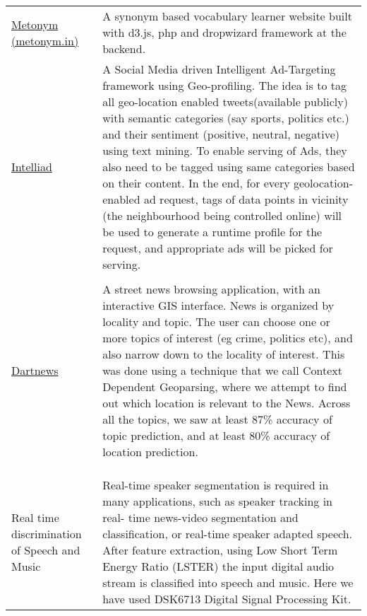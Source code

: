 \documentclass[8pt]{article}
\renewcommand{\section}[2]%
        {\pagebreak[2]\vspace{1.3\baselineskip}%
         \phantomsection\addcontentsline{toc}{section}{#1}%
         \hspace{0.2in}%
         \marginpar{
         \raggedright \scshape #1}#2}
\begin{document}
\section{Projects}
\begin{tabular}[t]{@{}p{\textwidth-\rcollength-180pt}p{\rcollength+150pt}}
        \href{http://metonym.in}{Metonym (metonym.in)} & A synonym based vocabulary learner website built with d3.js, php and dropwizard framework at the backend. \\        
    \href{http://github.com/debjyoti385/intelliad}{Intelliad} &  A Social Media driven Intelligent Ad-Targeting framework using Geo-profiling. The idea is to tag all geo-location enabled tweets(available publicly) with semantic categories (say sports, politics etc.) and their sentiment (positive, neutral, negative) using text mining. To enable serving of Ads, they also need to be tagged using same categories based on their content. In the end, for every geolocation-enabled ad request, tags of data points in vicinity (the neighbourhood being controlled online) will be used to generate a runtime profile for the request, and appropriate ads will be picked for serving.  \\
       \\
       \href{http://github.com/debjyoti385/dartnews}{Dartnews}   & A street news browsing application, with an interactive GIS interface. News is organized by locality and topic. The user can choose one or more topics of interest (eg crime, politics etc), and also narrow down to the locality of interest. This was done using a technique that we call Context Dependent Geoparsing, where we attempt to find out which location is relevant to the News. Across all the topics, we saw at least 87\% accuracy of topic prediction, and at least 80\% accuracy of location prediction.\\
       \\
       \\
       \\
Real time discrimination of Speech and Music & Real-time speaker segmentation is required in many applications, such as speaker tracking in real- time news-video segmentation and classification, or real-time speaker adapted speech. After feature extraction, using Low Short Term Energy Ratio (LSTER) the input digital audio stream is classified into speech and music. Here we have used DSK6713 Digital Signal Processing Kit.\\

\end{tabular}
\end{document}
